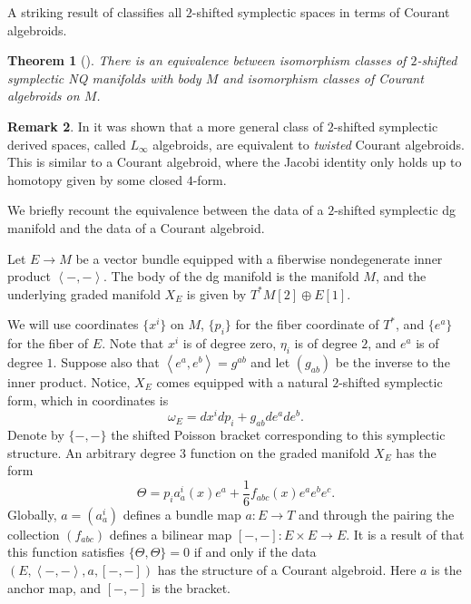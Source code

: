 \documentclass[letterpaper,12pt]{article}
\def\xto{\xrightarrow}
\newtheorem{theorem}{Theorem}[section]
\theoremstyle{definition}
\newtheorem{remark}[theorem]{Remark}
\theoremstyle{remark}
\theoremstyle{examples}
\begin{document}
A striking result of \cite{Roytenberg:2002nu} classifies all $2$-shifted symplectic spaces in terms of Courant algebroids. 

\begin{theorem}[\cite{Roytenberg:2002nu}]
There is an equivalence between isomorphism classes of $2$-shifted symplectic NQ manifolds with body $M$ and isomorphism classes of Courant algebroids on $M$.
\end{theorem}

\begin{remark}
In \cite{PymSafronov} it was shown that a more general class of $2$-shifted symplectic derived spaces, called $L_\infty$ algebroids, are equivalent to {\em twisted} Courant algebroids. 
This is similar to a Courant algebroid, where the Jacobi identity only holds up to homotopy given by some closed $4$-form. 
\end{remark}

We briefly recount the equivalence between the data of a $2$-shifted symplectic dg manifold and the data of a Courant algebroid.

\def\Sym{{\rm Sym}}

Let $E \to M$ be a vector bundle equipped with a fiberwise nondegenerate inner product $\left<-,-\right>$.
The body of the dg manifold is the manifold $M$, and the underlying graded manifold $X_E$ is given by $T^*M [2] \oplus E[1]$. 

We will use coordinates $\{x^i\}$ on $M$, $\{p_i\}$ for the fiber coordinate of $T^*$, and $\{e^a\}$ for the fiber of $E$. 
Note that $x^i$ is of degree zero, $\eta_i$ is of degree $2$, and $e^a$ is of degree $1$.
Suppose also that $\left<e^a, e^b\right> = g^{ab}$ and let $(g_{ab})$ be the inverse to the inner product. 
Notice, $X_E$ comes equipped with a natural $2$-shifted symplectic form, which in coordinates is 
\[
\omega_E = d x^i d p_i + g_{ab} d e^a d e^b .
\]
Denote by $\{-,-\}$ the shifted Poisson bracket corresponding to this symplectic structure. 
An arbitrary degree $3$ function on the graded manifold $X_E$ has the form
\[
\Theta = p_i a_a^i (x) e^a + \frac{1}{6} f_{abc} (x) e^a e^b e^c .
\]
Globally, $a = (a_a^i)$ defines a bundle map $a : E \to T$ and through the pairing the collection $(f_{abc})$ defines a bilinear map $[-,-] : E \times E \to E$. 
It is a result of \cite{Roytenberg:2002nu} that this function satisfies $\{\Theta, \Theta\} = 0$ if and only if the data $(E, \left<-,-\right>, a, [-,-])$ has the structure of a Courant algebroid. 
Here $a$ is the anchor map, and $[-,-]$ is the bracket. 
\end{document}

